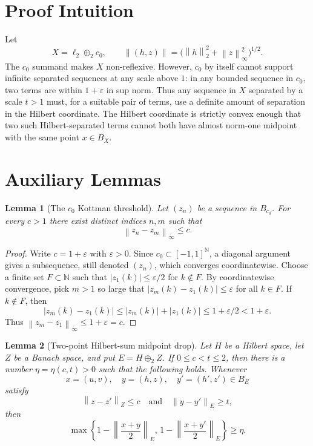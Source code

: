 \documentclass[11pt]{article}
\newtheorem{lemma}{Lemma}
\newcommand{\N}{\mathbb N}
\newcommand{\eps}{\varepsilon}
\newcommand{\norm}[1]{\left\lVert #1 \right\rVert}
\begin{document}
\section*{Proof Intuition}

Let
\[
  X=\ell_2\oplus_2 c_0,
  \qquad
  \norm{(h,z)}=\big(\norm{h}_2^2+\norm{z}_\infty^2\big)^{1/2}.
\]
The $c_0$ summand makes $X$ non-reflexive.  However, $c_0$ by itself cannot
support infinite separated sequences at any scale above $1$: in any bounded
sequence in $c_0$, two terms are within $1+\eps$ in sup norm.  Thus any
sequence in $X$ separated by a scale $t>1$ must, for a suitable pair of terms,
use a definite amount of separation in the Hilbert coordinate.  The Hilbert
coordinate is strictly convex enough that two such Hilbert-separated terms
cannot both have almost norm-one midpoint with the same point $x\in B_X$.

\section*{Auxiliary Lemmas}

\begin{lemma}[The $c_0$ Kottman threshold]\label{lem:c0}
Let $(z_n)$ be a sequence in $B_{c_0}$.  For every $c>1$ there exist distinct
indices $n,m$ such that
\[
  \norm{z_n-z_m}_\infty\le c .
\]
\end{lemma}

\begin{proof}
Write $c=1+\eps$ with $\eps>0$.  Since $c_0\subset[-1,1]^\N$, a diagonal
argument gives a subsequence, still denoted $(z_n)$, which converges
coordinatewise.  Choose a finite set $F\subset\N$ such that
$|z_1(k)|\le \eps/2$ for $k\notin F$.  By coordinatewise convergence, pick
$m>1$ so large that $|z_m(k)-z_1(k)|\le \eps$ for all $k\in F$.  If
$k\notin F$, then
\[
  |z_m(k)-z_1(k)|\le |z_m(k)|+|z_1(k)|\le 1+\eps/2<1+\eps.
\]
Thus $\norm{z_m-z_1}_\infty\le 1+\eps=c$.
\end{proof}

\begin{lemma}[Two-point Hilbert-sum midpoint drop]\label{lem:twopoint}
Let $H$ be a Hilbert space, let $Z$ be a Banach space, and put
$E=H\oplus_2 Z$.  If $0\le c<t\le 2$, then there is a number
$\eta=\eta(c,t)>0$ such that the following holds.  Whenever
\[
  x=(u,v),\quad y=(h,z),\quad y'=(h',z')\in B_E
\]
satisfy
\[
  \norm{z-z'}_Z\le c
  \quad\text{and}\quad
  \norm{y-y'}_E\ge t,
\]
then
\[
  \max\left\{
  1-\norm{\frac{x+y}{2}}_E,\,
  1-\norm{\frac{x+y'}{2}}_E
  \right\}\ge \eta .
\]
\end{lemma}
\end{document}

